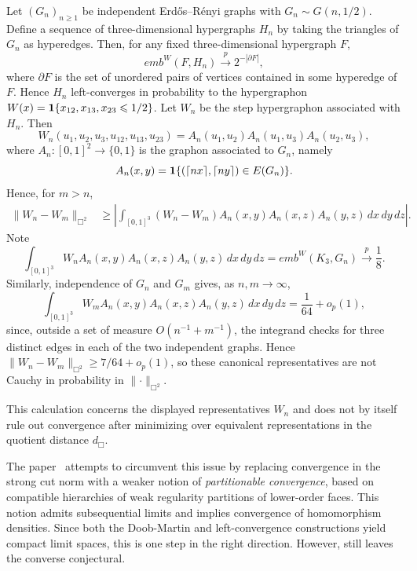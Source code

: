 \begin{subappendices}
\begin{example}
    Let $(G_n)_{n\geq1}$ be independent Erd\H{o}s--R\'enyi graphs with
    $G_n\sim G(n,1/2)$. Define a sequence of three-dimensional hypergraphs
    $H_n$ by taking the triangles of $G_n$ as hyperedges. Then, for any fixed
    three-dimensional hypergraph $F$,
        \[emb^W(F,H_n) \xrightarrow{p} 2^{-|\partial F|},\]
    \noindent where $\partial F$ is the set of unordered pairs of vertices
    contained in some hyperedge of $F$. Hence $H_n$ left-converges in probability to the
    hypergraphon $W(x)=\mathbf{1}\{x_{12},x_{13},x_{23}\leqslant1/2\}$. Let
    $W_n$ be the step hypergraphon associated with $H_n$. Then
        \[W_n(u_1,u_2,u_3,u_{12},u_{13},u_{23})
        = A_n(u_1,u_2)A_n(u_1,u_3)A_n(u_2,u_3),\]
    where $A_n:[0,1]^2\to\{0,1\}$ is the graphon associated
    to $G_n$, namely
        \[A_n(x,y) = \mathbf{1}\{(\lceil nx \rceil, \lceil ny \rceil) \in E(G_n)\}.\]
    \noindent Hence, for $m>n$,
    \begin{align*}
        \lVert W_n-W_m\rVert_{\Box^2}
        &\geq \left|\int_{[0,1]^3}(W_n-W_m)
        A_n(x,y)A_n(x,z)A_n(y,z)\,dx\,dy\,dz\right|.
    \end{align*}
    \noindent Note
        \[\int_{[0,1]^3}W_n A_n(x,y)A_n(x,z)A_n(y,z)\,dx\,dy\,dz
        = emb^W(K_3,G_n) \xrightarrow{p} \frac18.\]
    \noindent Similarly, independence of $G_n$ and $G_m$ gives, as $n,m\to\infty$,
        \[\int_{[0,1]^3}W_m A_n(x,y)A_n(x,z)A_n(y,z)\,dx\,dy\,dz
        = \frac{1}{64}+o_p(1),\]
    \noindent since, outside a set of measure $O(n^{-1}+m^{-1})$, the integrand
    checks for three distinct edges in each of the two independent graphs. Hence
    $\lVert W_n-W_m\rVert_{\Box^2}\geq 7/64+o_p(1)$, so these canonical
    representatives are not Cauchy in probability in $\lVert\cdot\rVert_{\Box^2}$.
\end{example}

\noindent This calculation concerns the displayed representatives $W_n$ and
does not by itself rule out convergence after minimizing over equivalent
representations in the quotient distance $d_\Box$.

\noindent The paper~\cite{zhao2015_hypergraph_limits_regularity_approach} attempts to circumvent this issue by
replacing convergence in the strong cut norm with a weaker notion of \textit{partitionable convergence},
based on compatible hierarchies of weak regularity partitions of lower-order faces. This notion admits subsequential
 limits and implies convergence of homomorphism densities. Since both the Doob-Martin and left-convergence constructions
 yield compact limit spaces, this is one step in the right direction. However, \cite{zhao2015_hypergraph_limits_regularity_approach}
 still leaves the converse conjectural.



\end{subappendices}
